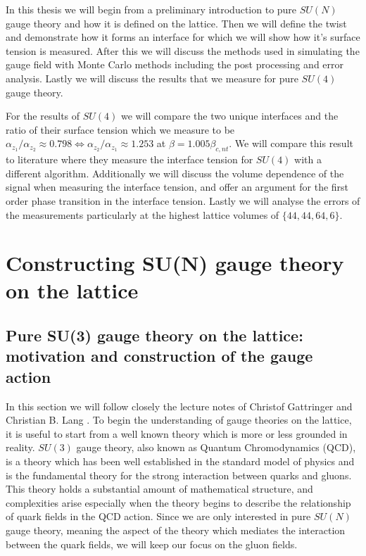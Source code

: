 \documentclass[english,twoside,openright]{UH_TCM_MSc}
\begin{document}
In this thesis we will begin from a preliminary introduction to pure $SU(N)$ gauge theory and how it is defined on the lattice. Then we will define the twist and demonstrate how it  forms an interface for which we will show how it's surface tension is measured. After this we will discuss the methods used in simulating the gauge field with Monte Carlo methods including the post processing and error analysis. Lastly we will discuss the results that we measure for pure $SU(4)$ gauge theory.

For the results of $SU(4)$ we will compare the two unique interfaces and the ratio of their surface tension which we measure to be $\alpha_{z_1}/\alpha_{z_2}\approx 0.798 \iff \alpha_{z_2}/\alpha_{z_1} \approx 1.253$ at $\beta = 1.005 \beta_{c,nt}$. We will compare this result to literature \cite{DEFORCRAND2005647} where they measure the interface tension for $SU(4)$ with a different algorithm. Additionally we will discuss the volume dependence of the signal when measuring the interface tension, and offer an argument for the first order phase transition in the interface tension. Lastly we will analyse the errors of the measurements particularly at the highest lattice volumes of $\{44,44,64,6\}$.

\chapter{Constructing SU(N) gauge theory on the lattice} \label{ch:sun_gauge_theory}

\section{Pure SU(3) gauge theory on the lattice: motivation and construction of the gauge action}

In this section we will follow closely the lecture notes of Christof Gattringer and Christian B. Lang \cite[ch.~2]{gattringer2009quantum}. To begin the understanding of gauge theories on the lattice, it is useful to start from a well known theory which is more or less grounded in reality. $SU(3)$ gauge theory, also known as Quantum Chromodynamics (QCD), is a theory which has been well established in the standard model of physics and is the fundamental theory for the strong interaction between quarks and gluons. This theory holds a substantial amount of mathematical structure, and complexities arise especially when the theory begins to describe the relationship of quark fields in the QCD action. Since we are only interested in pure $SU(N)$ gauge theory, meaning the aspect of the theory which mediates the interaction between the quark fields, we will keep our focus on the gluon fields.
\end{document}
